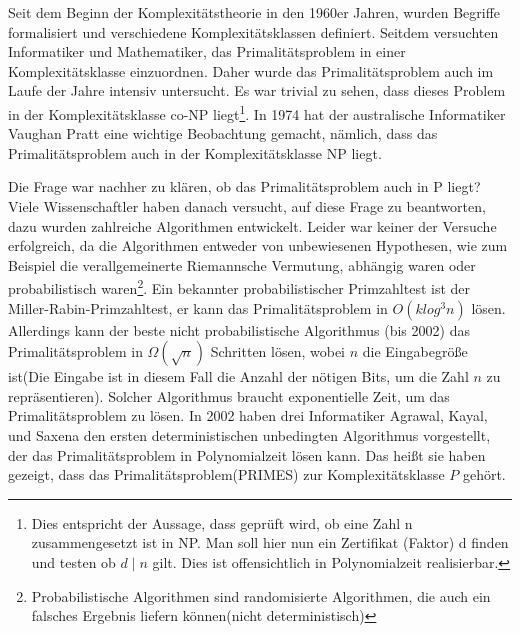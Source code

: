 \documentclass[12pt,oneside]{article}
\theoremstyle{remark}
\theoremstyle{definition}
\begin{document}
Seit dem Beginn der Komplexitätstheorie in den 1960er Jahren, wurden Begriffe formalisiert und verschiedene Komplexitätsklassen definiert\cite{com-theory}. Seitdem versuchten Informatiker und Mathematiker, das Primalitätsproblem in einer Komplexitätsklasse einzuordnen. Daher wurde das Primalitätsproblem auch im Laufe der Jahre intensiv untersucht. Es war trivial zu sehen, dass dieses Problem in der Komplexitätsklasse co-NP liegt\footnote{Dies entspricht der Aussage, dass geprüft wird, ob eine Zahl n zusammengesetzt ist in NP. Man soll hier nun ein Zertifikat (Faktor) d finden und testen ob $d \mid n$ gilt. Dies ist offensichtlich in Polynomialzeit realisierbar.\newline}. In 1974 hat der australische Informatiker Vaughan Pratt eine wichtige Beobachtung gemacht, nämlich, dass das Primalitätsproblem auch in der Komplexitätsklasse NP liegt\cite{pratt}.

Die Frage war nachher zu klären, ob das Primalitätsproblem auch in P liegt? Viele Wissenschaftler haben danach versucht, auf diese Frage zu beantworten, dazu wurden zahlreiche Algorithmen entwickelt. Leider war keiner der Versuche erfolgreich, da die Algorithmen entweder von unbewiesenen Hypothesen, wie zum Beispiel die verallgemeinerte Riemannsche Vermutung, abhängig waren oder probabilistisch waren\footnote{Probabilistische Algorithmen sind randomisierte Algorithmen, die auch ein falsches Ergebnis liefern können(nicht deterministisch)}. Ein bekannter probabilistischer Primzahltest ist der Miller-Rabin-Primzahltest, er kann das Primalitätsproblem in $O(k log^3 n)$ lösen\cite{milRab}. Allerdings kann der beste nicht probabilistische Algorithmus (bis 2002) das Primalitätsproblem in $ \Omega(\sqrt{n}) $ Schritten lösen, wobei $n$ die Eingabegröße ist(Die Eingabe ist in diesem Fall die Anzahl der nötigen Bits, um die Zahl $n$ zu repräsentieren). Solcher Algorithmus braucht exponentielle Zeit, um das Primalitätsproblem zu lösen. In 2002 haben drei Informatiker Agrawal, Kayal, und Saxena den ersten deterministischen unbedingten Algorithmus vorgestellt, der das Primalitätsproblem in Polynomialzeit lösen kann. Das heißt sie haben gezeigt, dass das Primalitätsproblem(PRIMES) zur Komplexitätsklasse $P$ gehört.      
\end{document}
